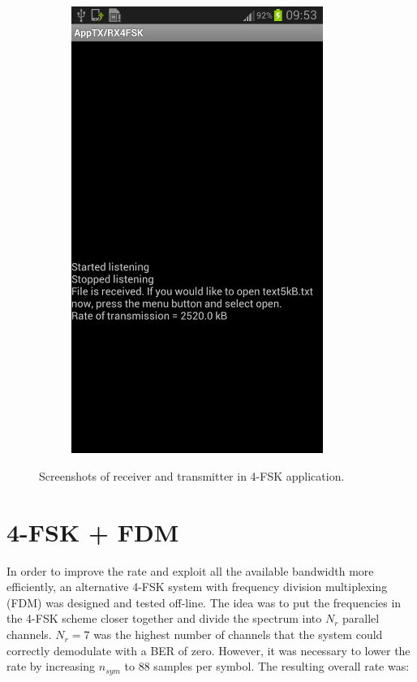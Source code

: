 \documentclass[12pt,a4paper,openright]{report}
\begin{document}
\begin{figure}[H]
\begin{subfigure}{.3\textwidth}
      \includegraphics[width=0.9\textwidth]{receiveFSKonline.png}
      \label{fig:appRXsideFSK}
   \end{subfigure}
     \caption[Screenshots of receiver and transmitter in 4-FSK application]{Screenshots of receiver and transmitter in 4-FSK application.}
     \label{fig:fskscreeshots}
 \end{figure} 


\section{4-FSK + FDM}

In order to improve the rate and exploit all the available bandwidth more efficiently, an alternative 4-FSK system with frequency division multiplexing (FDM) was designed and tested off-line. The idea was to put the frequencies in the 4-FSK scheme closer together and divide the spectrum into \(N_r\) parallel channels. \(N_r = 7\) was the highest number of channels that the system could correctly demodulate with a BER of zero. However, it was necessary to lower the rate by increasing \(n_{sym}\) to 88 samples per symbol. The resulting overall rate was:
\end{document}
